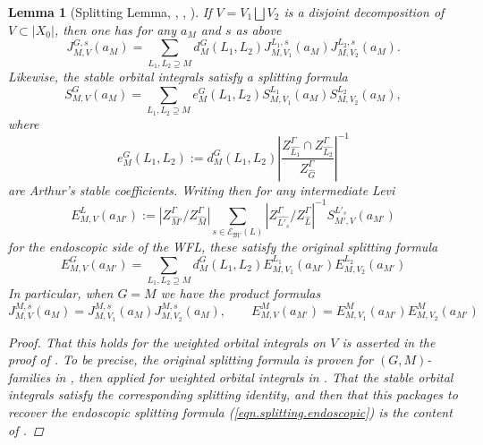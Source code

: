 \documentclass[openany]{amsbook}
\newtheorem{lemma}[theorem]{Lemma}
\theoremstyle{definition}
\theoremstyle{remark}
\numberwithin{equation}{section}
\newcommand{\cE}{\mathcal{E}}
\renewcommand{\-}{\operatorname{-}}
\newcommand{\fM}{\mathfrak{M}}
\begin{document}
\begin{lemma}[{Splitting Lemma, \cite{arthurinvlocal}, \cite{arthurtransferwoi}, \cite[Proposition 16.4.1,17.4.1]{CLII}}]\label{lem.splitting.lemma}
    If $V = V_1 \bigsqcup V_2$ is a disjoint decomposition of $V \subset |X_0|$, then one has for any $a_M$ and $s$ as above
    \begin{equation}
        J_{M,V}^{G,s}(a_M) = \sum_{L_1, L_2 \supseteq M} d_M^G(L_1, L_2) J_{M,{V_1}}^{L_1, s}(a_M) J_{M,{V_2}}^{L_2, s}(a_M).\label{eqn.splitting.formula}
    \end{equation}
    Likewise, the stable orbital integrals satisfy a splitting formula
    \begin{equation}
        S_{M,V}^{G}(a_M) = \sum_{L_1, L_2 \supseteq M} e_M^G(L_1, L_2) S_{M,V_1}^{L_1}(a_M) S_{M,V_2}^{L_2}(a_M),\label{eqn.splitting.formula.stable}
    \end{equation}
    where $$e_M^G(L_1,L_2) := d_M^G(L_1, L_2) \left|\frac{Z_{\widehat{L_1}}^\Gamma \cap Z_{\widehat{L_2}}^\Gamma}{Z_{\widehat{G}}^\Gamma} \right|^{-1}$$
    are Arthur's stable coefficients. Writing then for any intermediate Levi
    $$
        E_{M,V}^{L}(a_{M'}) := |Z^\Gamma_{\widehat{M}'}/ Z_{\widehat{M}}^\Gamma| \sum_{s \in \cE_{\fM'}(L)} |Z_{\widehat{L'_s}}^\Gamma/ Z_{\widehat{L}}^\Gamma |^{-1} S_{M',V}^{L'_s}(a_{M'})
    $$
    for the endoscopic side of the WFL, these satisfy the original splitting formula
    \begin{equation}
        E_{M,V}^{G}(a_{M'}) = \sum_{L_1, L_2 \supseteq M} d_M^G(L_1, L_2) E_{M,{V_1}}^{L_1}(a_{M'}) E_{M,{V_2}}^{L_2}(a_{M'})\label{eqn.splitting.endoscopic}
    \end{equation}
    In particular, when $G = M$ we have the product formulas
    $$
        J_{M,V}^{M,s}(a_M) = J_{M,{V_1}}^{M, s}(a_M) J_{M,{V_2}}^{M, s}(a_M), \qquad E_{M,V}^{M}(a_{M'}) = E_{M,{V_1}}^{M}(a_{M'}) E_{M,{V_2}}^{M}(a_{M'})
    $$
    \begin{proof}
        That this holds for the weighted orbital integrals on $V$ is asserted in the proof of \cite[Proposition 8.1]{ArthurStableI}. To be precise, the original splitting formula is proven for $(G,M)$-families in \cite[Corollary 7.4]{arthurinvlocal}, then applied for weighted orbital integrals in \cite[Proposition 4.3]{arthurtransferwoi}. That the stable orbital integrals satisfy the corresponding splitting identity, and then that this packages to recover the endoscopic splitting formula  (\ref{eqn.splitting.endoscopic}) is the content of \cite[Theorem 6.1]{arthurtransferwoi}. 


\end{proof}
\end{lemma}
\end{document}

